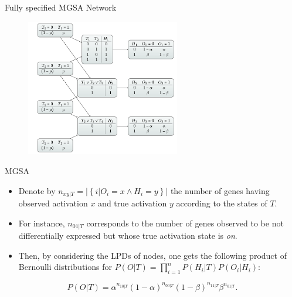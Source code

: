 \documentclass{beamer}
\newcommand{\numberofgenes}[3][|T]{n_{#2#3#1}}
\begin{document}
\begin{frame}{Fully specified MGSA Network}
 \begin{figure}
 \centering
 \includegraphics[width=0.6\textwidth]{./img/fullyspecifiedMGSA.png}
\end{figure}

 
\end{frame}



\begin{frame}{MGSA}

\begin{itemize}
 \item Denote by $\numberofgenes{x}{y} = |\left\{ i|O_{i}=x \wedge
  H_{i}=y\right\} |$ the number of genes having observed activation
$x$ and true activation $y$ according to the states of $T$. 
\item For
instance, $\numberofgenes{0}{1}$ corresponds to the number of genes
observed to be not differentially expressed but whose true activation
state is \textit{on}. 
\item Then, by considering the LPDs of nodes, one gets
the following product of Bernoulli distributions for $P(O|T)=
\prod_{i=1}^n P(H_i|T) P(O_i|H_i)$:
\end{itemize}

  


\begin{equation}
P(O|T) = \alpha^{\numberofgenes{1}{0}} (1 - \alpha)^{\numberofgenes{0}{0}}
(1-\beta)^{\numberofgenes{1}{1}} \beta^{\numberofgenes{0}{1}}.
\label{eq:alpha.beta.score}
\end{equation}
\end{frame}
\end{document}
